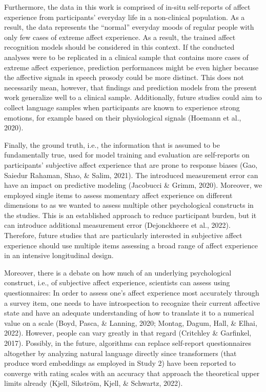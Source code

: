 \documentclass[
  english,
  man,floatsintext]{apa6}
\begin{document}
Furthermore, the data in this work is comprised of in-situ self-reports of affect experience from participants' everyday life in a non-clinical population. As a result, the data represents the ``normal'' everyday moods of regular people with only few cases of extreme affect experience. As a result, the trained affect recognition models should be considered in this context. If the conducted analyses were to be replicated in a clinical sample that contains more cases of extreme affect experience, prediction performances might be even higher because the affective signals in speech prosody could be more distinct. This does not necessarily mean, however, that findings and prediction models from the present work generalize well to a clinical sample. Additionally, future studies could aim to collect language samples when participants are known to experience strong emotions, for example based on their physiological signals (Hoemann et al., 2020).

Finally, the ground truth, i.e., the information that is assumed to be fundamentally true, used for model training and evaluation are self-reports on participants' subjective affect experience that are prone to response biases (Gao, Saiedur Rahaman, Shao, \& Salim, 2021). The introduced measurement error can have an impact on predictive modeling (Jacobucci \& Grimm, 2020). Moreover, we employed single items to assess momentary affect experience on different dimensions to as we wanted to assess multiple other psychological constructs in the studies. This is an established approach to reduce participant burden, but it can introduce additional measurement error (Dejonckheere et al., 2022). Therefore, future studies that are particularly interested in subjective affect experience should use multiple items assessing a broad range of affect experience in an intensive longitudinal design.

Moreover, there is a debate on how much of an underlying psychological construct, i.e., of subjective affect experience, scientists can assess using questionnaires: In order to assess one's affect experience most accurately through a survey item, one needs to have introspection to recognize their current affective state and have an adequate understanding of how to translate it to a numerical value on a scale (Boyd, Pasca, \& Lanning, 2020; Montag, Dagum, Hall, \& Elhai, 2022). However, people can vary greatly in that regard (Critchley \& Garfinkel, 2017). Possibly, in the future, algorithms can replace self-report questionnaires altogether by analyzing natural language directly since transformers (that produce word embeddings as employed in Study 2) have been reported to converge with rating scales with an accuracy that approach the theoretical upper limits already (Kjell, Sikström, Kjell, \& Schwartz, 2022).
\end{document}
